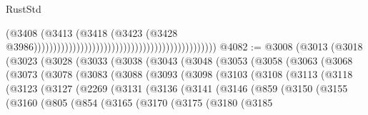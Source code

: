 \begin{lexlean}{RustStd}
\begin{coremodule}
                                                                                        (@3408
                                                                                          (@3413
                                                                                            (@3418
                                                                                              (@3423
                                                                                                (@3428
                                                                                                  @3986)))))))))))))))))))))))))))))))))))))))))))))))
@4082 := @3008
    (@3013
      (@3018
        (@3023
          (@3028
            (@3033
              (@3038
                (@3043
                  (@3048
                    (@3053
                      (@3058
                        (@3063
                          (@3068
                            (@3073
                              (@3078
                                (@3083
                                  (@3088
                                    (@3093
                                      (@3098
                                        (@3103
                                          (@3108
                                            (@3113
                                              (@3118
                                                (@3123
                                                  (@3127
                                                    (@2269
                                                      (@3131
                                                        (@3136
                                                          (@3141
                                                            (@3146
                                                              (@859
                                                                (@3150
                                                                  (@3155
                                                                    (@3160
                                                                      (@805
                                                                        (@854
                                                                          (@3165
                                                                            (@3170
                                                                              (@3175
                                                                                (@3180
                                                                                  (@3185

\end{coremodule}
\end{lexlean}
